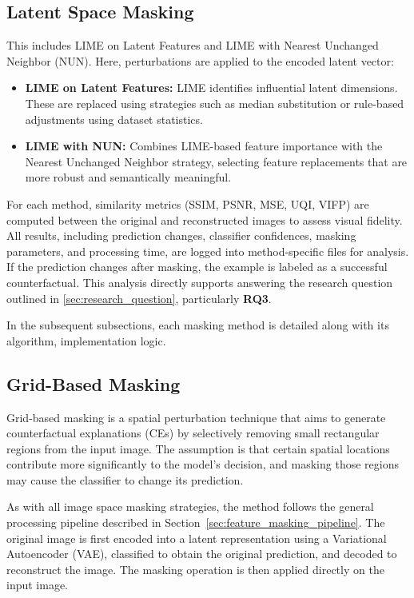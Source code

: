 \subsection*{Latent Space Masking}
This includes LIME on Latent Features and LIME with Nearest Unchanged Neighbor (NUN). Here, perturbations are applied to the encoded latent vector:
\begin{itemize}
    \item \textbf{LIME on Latent Features:} LIME identifies influential latent dimensions. These are replaced using strategies such as median substitution or rule-based adjustments using dataset statistics.
    \item \textbf{LIME with NUN:} Combines LIME-based feature importance with the Nearest Unchanged Neighbor strategy, selecting feature replacements that are more robust and semantically meaningful.
\end{itemize}

For each method, similarity metrics (SSIM, PSNR, MSE, UQI, VIFP) are computed between the original and reconstructed images to assess visual fidelity. All results, including prediction changes, classifier confidences, masking parameters, and processing time, are logged into method-specific files for analysis. If the prediction changes after masking, the example is labeled as a successful counterfactual. This analysis directly supports answering the research question outlined in \cref{sec:research_question}, particularly \textbf{RQ3}.


In the subsequent subsections, each masking method is detailed along with its algorithm, implementation logic.
 

\subsection{Grid-Based Masking} \label{sec:grid_based_masking}

Grid-based masking is a spatial perturbation technique that aims to generate counterfactual explanations (CEs) by selectively removing small rectangular regions from the input image. The assumption is that certain spatial locations contribute more significantly to the model’s decision, and masking those regions may cause the classifier to change its prediction.

As with all image space masking strategies, the method follows the general processing pipeline described in Section~\ref{sec:feature_masking_pipeline}. The original image is first encoded into a latent representation using a Variational Autoencoder (VAE), classified to obtain the original prediction, and decoded to reconstruct the image. The masking operation is then applied directly on the input image.


